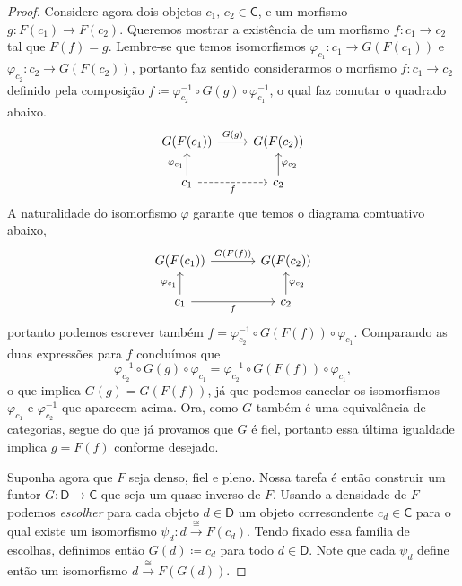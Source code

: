 \begin{proof}
  Considere agora dois objetos $c_{1},\, c_{2} \in \mathsf{C}$, e um morfismo $g: F(c_{1}) \to F(c_{2})$.
  Queremos mostrar a existência de um morfismo $f: c_{1} \to c_{2}$ tal que $F(f) = g$.
  Lembre-se que temos isomorfismos $\varphi_{c_{1}}: c_{1} \to G(F(c_{1}))$ e $\varphi_{c_{2}}: c_{2} \to G(F(c_{2}))$, portanto faz sentido considerarmos o morfismo $f: c_{1} \to c_{2}$ definido pela composição $f \coloneqq \varphi_{c_{2}}^{-1} \circ G(g) \circ \varphi_{c_{1}}^{-1}$, o qual faz comutar o quadrado abaixo.
  \begin{displaymath}
    \begin{tikzcd}
      G(F(c_{1}))
      \arrow[r, "G(g)"]
      & G(F(c_{2}))
      \\ c_{1}
      \arrow[u, "\varphi_{c_{1}}"]
      \arrow[r, dashed, "f" swap]
      & c_{2}
      \arrow[u, "\varphi_{c_{2}}" swap]
    \end{tikzcd}
  \end{displaymath}
  A naturalidade do isomorfismo $\varphi$ garante que temos o diagrama comtuativo abaixo,
  \begin{displaymath}
    \begin{tikzcd}[column sep=1.25cm]
      G(F(c_{1}))
      \arrow[r, "G(F(f))"]
      & G(F(c_{2}))
      \\ c_{1}
      \arrow[r, "f" swap]
      \arrow[u, "\varphi_{c_{1}}"]
      & c_{2}
      \arrow[u, "\varphi_{c_{2}}" swap]
    \end{tikzcd}
  \end{displaymath}
  portanto podemos escrever também $f = \varphi_{c_{2}}^{-1} \circ G(F(f)) \circ \varphi_{c_{1}}$.
  Comparando as duas expressões para $f$ concluímos que
  \begin{displaymath}
    \varphi_{c_{2}}^{-1} \circ G(g) \circ \varphi_{c_{1}} = \varphi_{c_{2}}^{-1} \circ G(F(f)) \circ \varphi_{c_{1}},
  \end{displaymath}
  o que implica $G(g) = G(F(f))$, já que podemos cancelar os isomorfismos $\varphi_{c_{1}}$ e $\varphi_{c_{2}}^{-1}$ que aparecem acima.
  Ora, como $G$ também é uma equivalência de categorias, segue do que já provamos que $G$ é fiel, portanto essa última igualdade implica $g = F(f)$ conforme desejado.

  Suponha agora que $F$ seja denso, fiel e pleno.
  Nossa tarefa é então construir um funtor $G: \mathsf{D} \to \mathsf{C}$ que seja um quase-inverso de $F$.
  Usando a densidade de $F$ podemos \emph{escolher} para cada objeto $d \in \mathsf{D}$ um objeto corresondente $c_{d} \in \mathsf{C}$ para o qual existe um isomorfismo $\psi_{d}: d \overset{\cong}{\longrightarrow} F(c_{d})$.
  Tendo fixado essa família de escolhas, definimos então $G(d) \coloneqq c_{d}$ para todo $d \in \mathsf{D}$.
  Note que cada $\psi_{d}$ define então um isomorfismo $d \overset{\cong}{\longrightarrow} F(G(d))$.


\end{proof}
